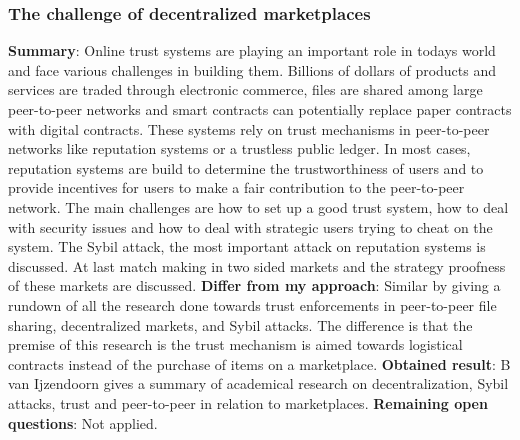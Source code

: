 \subsubsection{The challenge of decentralized marketplaces \cite{challangeDecentralizedMarketplaces}}
\textbf{Summary}: Online trust systems are playing an important role in todays world and face various challenges in building them. Billions of dollars of products and services are traded through electronic commerce, files are shared among large peer-to-peer networks and smart contracts can potentially replace paper contracts with digital contracts. These systems rely on trust mechanisms in peer-to-peer networks like reputation systems or a trustless public ledger. In most cases, reputation systems are build to determine the trustworthiness of users and to provide incentives for users to make a fair contribution to the peer-to-peer network. The main challenges are how to set up a good trust system, how to deal with security issues and how to deal with strategic users trying to cheat on the system. The Sybil attack, the most important attack on reputation systems is discussed. At last match making in two sided markets and the strategy proofness of these markets are discussed.\newline
\textbf{Differ from my approach}: Similar by giving a rundown of all the research done towards trust enforcements in peer-to-peer file sharing, decentralized markets, and Sybil attacks. The difference is that the premise of this research is the trust mechanism is aimed towards logistical contracts instead of the purchase of items on a marketplace.\newline
\textbf{Obtained result}: B van Ijzendoorn gives a summary of academical research on decentralization, Sybil attacks, trust and peer-to-peer in relation to marketplaces. \newline
\textbf{Remaining open questions}: Not applied.\newline

